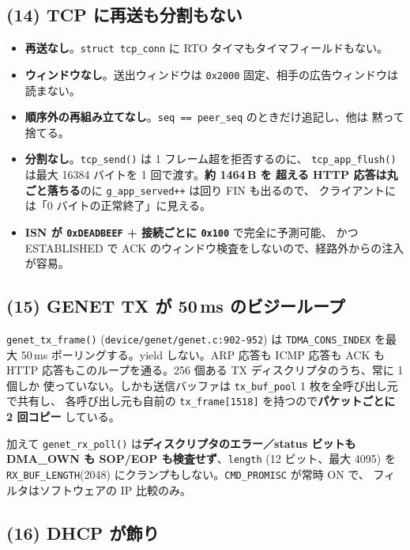 \documentclass[a4paper,11pt]{ltjsarticle}
\begin{document}
\subsection{(14) TCP に再送も分割もない}

\begin{itemize}[leftmargin=1.4em,itemsep=2pt]
\item \textbf{再送なし}。\texttt{struct tcp\_conn} に RTO タイマもタイマフィールドもない。
\item \textbf{ウィンドウなし}。送出ウィンドウは \texttt{0x2000} 固定、相手の広告ウィンドウは
      読まない。
\item \textbf{順序外の再組み立てなし}。\texttt{seq == peer\_seq} のときだけ追記し、他は
      黙って捨てる。
\item \textbf{分割なし}。\texttt{tcp\_send()} は 1 フレーム超を拒否するのに、
      \texttt{tcp\_app\_flush()} は最大 16384 バイトを 1 回で渡す。\textbf{約 1464\,B を
      超える HTTP 応答は丸ごと落ちる}のに \texttt{g\_app\_served++} は回り FIN も出るので、
      クライアントには「0 バイトの正常終了」に見える。
\item \textbf{ISN が \texttt{0xDEADBEEF} + 接続ごとに \texttt{0x100}} で完全に予測可能、
      かつ ESTABLISHED で ACK のウィンドウ検査をしないので、経路外からの注入が容易。
\end{itemize}

\subsection{(15) GENET TX が 50\,ms のビジーループ}

\texttt{genet\_tx\_frame()} (\texttt{device/genet/genet.c:902-952}) は
\texttt{TDMA\_CONS\_INDEX} を最大 50\,ms ポーリングする。yield しない。ARP 応答も ICMP 応答も
ACK も HTTP 応答もこのループを通る。256 個ある TX ディスクリプタのうち、常に 1 個しか
使っていない。しかも送信バッファは \texttt{tx\_buf\_pool} 1 枚を全呼び出し元で共有し、
各呼び出し元も自前の \texttt{tx\_frame[1518]} を持つので\textbf{パケットごとに 2 回コピー}
している。

加えて \texttt{genet\_rx\_poll()} は\textbf{ディスクリプタのエラー／status ビットも
DMA\_OWN も SOP/EOP も検査せず}、\texttt{length} (12 ビット、最大 4095) を
\texttt{RX\_BUF\_LENGTH}(2048) にクランプもしない。\texttt{CMD\_PROMISC} が常時 ON で、
フィルタはソフトウェアの IP 比較のみ。

\subsection{(16) DHCP が飾り}
\end{document}
